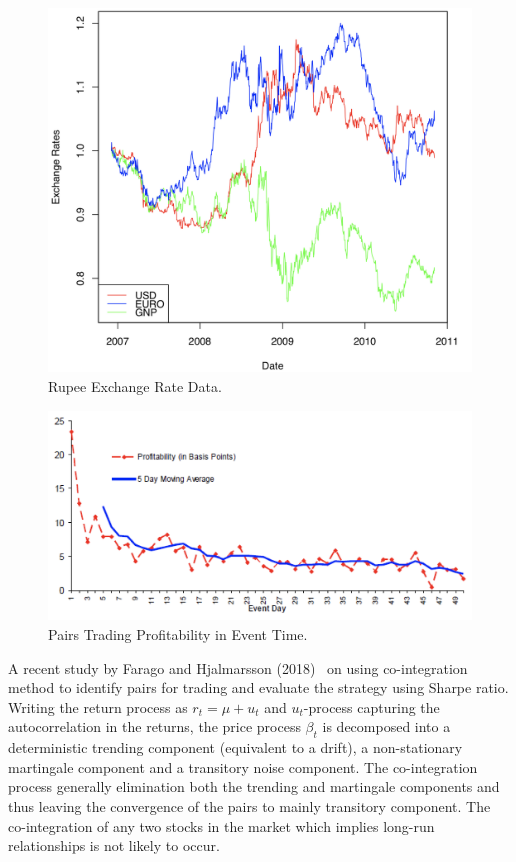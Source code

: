 	\begin{figure}[!ht]
	\centering
	\includegraphics[width=\textwidth]{chapters/chapter_stat_ts/figures/473.png}
	\caption{Rupee Exchange Rate Data. \label{fig:rupee}}
	\end{figure}

	\begin{figure}[!ht]
	\centering
	\includegraphics[width=\textwidth]{chapters/chapter_stat_ts/figures/Sec4-7Fig4.png}
	\caption{Pairs Trading Profitability in Event Time. \label{fig:pairsprofit}}
	\end{figure}

A recent study by Farago and Hjalmarsson (2018)~\cite{faragohjalm} on using co-integration method to identify pairs for trading and evaluate the strategy using Sharpe ratio. Writing the return process as $r_t= \mu + u_t$ and $u_t$-process capturing the autocorrelation in the returns, the price process $\beta_t$ is decomposed into a deterministic trending component (equivalent to a drift), a non-stationary martingale component and a transitory noise component. The co-integration process generally elimination both the trending and martingale components and thus leaving the convergence of the pairs to mainly transitory component. The co-integration of any two stocks in the market which implies long-run relationships is not likely to occur.


